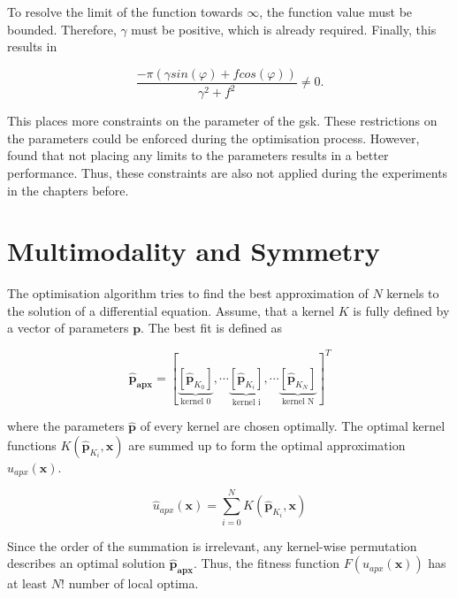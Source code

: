 \documentclass[./\jobname.tex]{subfiles}
\begin{document}
To resolve the limit of the function towards $\infty$, the function value must be bounded. Therefore, $\gamma$ must be positive, which is already required. Finally, this results in 

\begin{equation}
	\frac{-\pi (\gamma sin(\varphi) + f cos(\varphi))}{\gamma^2 + f^2} \neq 0.
\end{equation}

This places more constraints on the parameter of the \gls{gsk}. These restrictions on the parameters could be enforced during the optimisation process. However, \cite{chaquet_using_2019} found that not placing any limits to the parameters results in a better performance. Thus, these constraints are also not applied during the experiments in the chapters before. 

\section{Multimodality and Symmetry}
\label{chap:multimodality_and_symmetry}

The optimisation algorithm tries to find the best approximation of $N$ kernels to the solution of a differential equation. Assume, that a kernel $K$ is fully defined by a vector of parameters $\mathbf{p}$. The best fit is defined as 

\begin{equation}
\mathbf{\hat{p}_{apx}} = \left[\underbrace{\left[ \mathbf{\hat{p}}_{K_0} \right] }_{\text{kernel 0}}, \cdots \underbrace{\left[ \mathbf{\hat{p}}_{K_i} \right] }_{\text{kernel i}}, \cdots \underbrace{\left[ \mathbf{\hat{p}}_{K_N} \right]}_{\text{kernel N}} \right]^T
\end{equation}

where the parameters $\mathbf{\hat{p}}$ of every kernel are chosen optimally. The optimal kernel functions $K(\mathbf{\hat{p}}_{K_i}, \mathbf{x})$ are summed up to form the optimal approximation $\hat{u}_{apx}(\mathbf{x})$. 

\begin{equation}
\label{eq:uapx_kernel_sum}
\hat{u}_{apx}(\mathbf{x}) = \sum_{i=0}^{N} K(\mathbf{\hat{p}}_{K_i}, \mathbf{x})
\end{equation}

Since the order of the summation is irrelevant, any kernel-wise permutation describes an optimal solution $\mathbf{\hat{p}_{apx}}$. Thus, the fitness function $F(u_{apx}(\mathbf{x}))$ has at least $N!$ number of local optima. 
\end{document}
